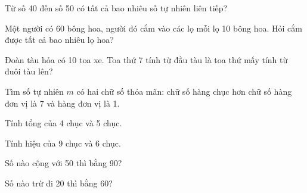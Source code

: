 \begin{ex}
Từ số 40 đến số 50 có tất cả bao nhiêu số tự nhiên liên tiếp?
\end{ex}

\begin{ex}
Một người có 60 bông hoa, người đó cắm vào các lọ mỗi lọ 10 bông hoa. Hỏi cắm được tất cả bao nhiêu lọ hoa?
\end{ex}

\begin{ex}
Đoàn tàu hỏa có 10 toa xe. Toa thứ 7 tính từ đầu tàu là toa thứ mấy tính từ đuôi tàu lên?
\end{ex}

\begin{ex}
Tìm số tự nhiên $m$ có hai chữ số thỏa mãn: chữ số hàng chục hơn chữ số hàng đơn vị là 7 và hàng đơn vị là 1.
\end{ex}

\begin{ex}
Tính tổng của 4 chục và 5 chục.
\end{ex}

\begin{ex}
Tính hiệu của 9 chục và 6 chục.
\end{ex}

\begin{ex}
Số nào cộng với 50 thì bằng 90?
\end{ex}

\begin{ex}
Số nào trừ đi 20 thì bằng 60?
\end{ex}
